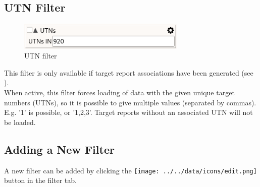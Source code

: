 % 
% 
% 
% 

\subsection{UTN Filter}

\begin{figure}[H]
  \center
    \includegraphics[width=8cm,frame]{figures/filter_utn.png}
  \caption{UTN filter}
\end{figure}

This filter is only available if target report associations have been generated (see ). \\

When active, this filter forces loading of data with the given unique target numbers (UTNs), so it is possible to give multiple values (separated by commas). E.g. '1' is possible, or '1,2,3'. Target reports without an associated UTN will not be loaded. \\

\subsection{Adding a New Filter}

A new filter can be added by clicking the \texttt{[image: ../../data/icons/edit.png]} button in the filter tab.

